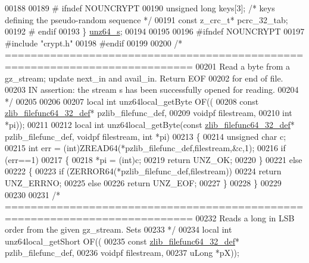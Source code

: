 \begin{DoxyCode}
00188 
00189 \textcolor{preprocessor}{#    ifndef NOUNCRYPT}
00190     \textcolor{keywordtype}{unsigned} \textcolor{keywordtype}{long} keys[3];     \textcolor{comment}{/* keys defining the pseudo-random sequence */}
00191     \textcolor{keyword}{const} z\_crc\_t* pcrc\_32\_tab;
00192 \textcolor{preprocessor}{#    endif}
00193 \} \hyperlink{structunz64__s}{unz64\_s};
00194 
00195 
00196 \textcolor{preprocessor}{#ifndef NOUNCRYPT}
00197 \textcolor{preprocessor}{#include "crypt.h"}
00198 \textcolor{preprocessor}{#endif}
00199 
00200 \textcolor{comment}{/* ===========================================================================}
00201 \textcolor{comment}{     Read a byte from a gz\_stream; update next\_in and avail\_in. Return EOF}
00202 \textcolor{comment}{   for end of file.}
00203 \textcolor{comment}{   IN assertion: the stream s has been successfully opened for reading.}
00204 \textcolor{comment}{*/}
00205 
00206 
00207 local \textcolor{keywordtype}{int} unz64local\_getByte OF((
00208     \textcolor{keyword}{const} \hyperlink{structzlib__filefunc64__32__def__s}{zlib\_filefunc64\_32\_def}* pzlib\_filefunc\_def,
00209     voidpf filestream,
00210     \textcolor{keywordtype}{int} *pi));
00211 
00212 local \textcolor{keywordtype}{int} unz64local\_getByte(\textcolor{keyword}{const} \hyperlink{structzlib__filefunc64__32__def__s}{zlib\_filefunc64\_32\_def}* pzlib\_filefunc\_def, voidpf
       filestream, \textcolor{keywordtype}{int} *pi)
00213 \{
00214     \textcolor{keywordtype}{unsigned} \textcolor{keywordtype}{char} c;
00215     \textcolor{keywordtype}{int} err = (int)ZREAD64(*pzlib\_filefunc\_def,filestream,&c,1);
00216     \textcolor{keywordflow}{if} (err==1)
00217     \{
00218         *pi = (int)c;
00219         \textcolor{keywordflow}{return} UNZ\_OK;
00220     \}
00221     \textcolor{keywordflow}{else}
00222     \{
00223         \textcolor{keywordflow}{if} (ZERROR64(*pzlib\_filefunc\_def,filestream))
00224             \textcolor{keywordflow}{return} UNZ\_ERRNO;
00225         \textcolor{keywordflow}{else}
00226             \textcolor{keywordflow}{return} UNZ\_EOF;
00227     \}
00228 \}
00229 
00230 
00231 \textcolor{comment}{/* ===========================================================================}
00232 \textcolor{comment}{   Reads a long in LSB order from the given gz\_stream. Sets}
00233 \textcolor{comment}{*/}
00234 local \textcolor{keywordtype}{int} unz64local\_getShort OF((
00235     \textcolor{keyword}{const} \hyperlink{structzlib__filefunc64__32__def__s}{zlib\_filefunc64\_32\_def}* pzlib\_filefunc\_def,
00236     voidpf filestream,
00237     uLong *pX));

\end{DoxyCode}
